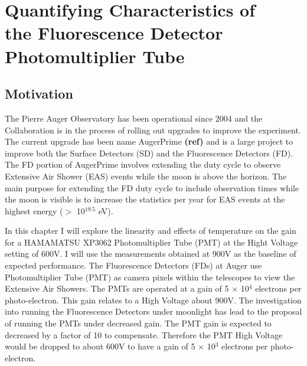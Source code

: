 \chapter[Quantifying Characteristics of the FD PMT]{\centering Quantifying Characteristics of \\ the Fluorescence Detector \\ Photomultiplier Tube \\}\label{Ch:PMTCharacter}



\section{Motivation}

%
%

The Pierre Auger Observatory has been operational since 2004 and the Collaboration is in the process of rolling out upgrades to improve the experiment. The current upgrade has been name AugerPrime \textbf{(ref)} and is a large project to improve both the Surface Detectors (SD) and the Fluorescence Detectors (FD). The FD portion of AugerPrime involves extending the duty cycle to observe Extensive Air Shower (EAS) events while the moon is above the horizon. The main purpose for extending the FD duty cycle to include observation times while the moon is visible is to increase the statistics per year for EAS events at the highest energy ($>$ 10$^{19.5}$ eV). 

In this chapter I will explore the linearity and effects of temperature on the gain for a HAMAMATSU XP3062 Photomultiplier Tube (PMT) at the Hight Voltage setting of 600V. I will use the measurements obtained at 900V as the baseline of expected performance. The Fluorescence Detectors (FDs) at Auger use Photomultiplier Tube (PMT) as camera pixels within the telescopes to view the Extensive Air Showers. The PMTs are operated at a gain of 5 $\times$ 10$^4$ electrons per photo-electron. This gain relates to a High Voltage about 900V. The investigation into running the Fluorescence Detectors under moonlight has lead to the proposal of running the PMTs under decreased gain. The PMT gain is expected to decreased by a factor of 10 to compensate. Therefore the PMT High Voltage would be dropped to about 600V to have a gain of 5 $\times$ 10$^3$ electrons per photo-electron.

